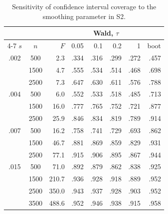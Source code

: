\begin{table}[H]\centering\small
\caption{Sensitivity of confidence interval coverage to the smoothing parameter in S2.}\label{tab:S3}
\begin{tabular}{ccrrrrrr}
\toprule
& & & \multicolumn{4}{c}{Wald, $\tau$} & \\ \cmidrule(lr){4-7}
$s$ & $n$ & $F$ & 0.05 & 0.1 & 0.2 & 1 & boot \\
\midrule
.002 & 500 & 2.3 & .334 & .316 & .299 & .272 & .457 \\
 & 1500 & 4.7 & .555 & .534 & .514 & .468 & .698 \\
 & 2500 & 7.3 & .647 & .630 & .611 & .576 & .788 \\
.004 & 500 & 6.0 & .552 & .533 & .518 & .485 & .713 \\
 & 1500 & 16.0 & .777 & .765 & .752 & .721 & .877 \\
 & 2500 & 25.9 & .846 & .834 & .819 & .789 & .914 \\
.007 & 500 & 16.2 & .758 & .741 & .729 & .693 & .862 \\
 & 1500 & 46.7 & .881 & .869 & .859 & .829 & .931 \\
 & 2500 & 77.1 & .915 & .906 & .895 & .867 & .944 \\
.015 & 500 & 71.0 & .892 & .879 & .862 & .838 & .925 \\
 & 1500 & 210.7 & .936 & .928 & .918 & .889 & .952 \\
 & 2500 & 350.0 & .943 & .937 & .928 & .903 & .952 \\
 & 3500 & 488.6 & .952 & .946 & .938 & .915 & .958 \\
\bottomrule
\end{tabular}
\end{table}
